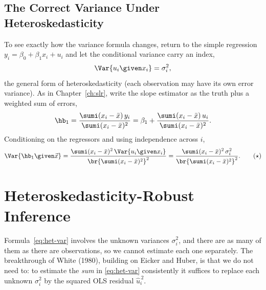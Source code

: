 \subsection{The Correct Variance Under Heteroskedasticity}

To see exactly how the variance formula changes, return to the simple regression $y_i = \beta_0 + \beta_1 x_i + u_i$ and let the conditional variance carry an index,
\[
\Var{u_i \given x_i} = \sigma_i^2,
\]
the general form of heteroskedasticity (each observation may have its own error variance). As in Chapter~\ref{ch:slr}, write the slope estimator as the truth plus a weighted sum of errors,
\[
\hb_1 = \frac{\sumi (x_i-\bar x)\,y_i}{\sumi (x_i-\bar x)^2}
      = \beta_1 + \frac{\sumi (x_i-\bar x)\,u_i}{\sumi (x_i-\bar x)^2}.
\]
Conditioning on the regressors and using independence across $i$,
\[
\Var{\hb_1 \given \vec x}
= \frac{\sumi (x_i-\bar x)^2\,\Var{u_i \given x_i}}{\br{\sumi (x_i-\bar x)^2}^2}
= \frac{\sumi (x_i-\bar x)^2\,\sigma_i^2}{\br{\sumi (x_i-\bar x)^2}^2}.
\tag{$\star$}\label{eq:het-var}
\]


\section{Heteroskedasticity-Robust Inference}
\label{sec:robust}

Formula~\eqref{eq:het-var} involves the unknown variances $\sigma_i^2$, and there are as many of them as there are observations, so we cannot estimate each one separately. The breakthrough of White (1980), building on Eicker and Huber, is that we do not need to: to estimate the \emph{sum} in \eqref{eq:het-var} consistently it suffices to replace each unknown $\sigma_i^2$ by the squared OLS residual $\hat u_i^{\,2}$.


